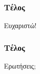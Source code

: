 \documentclass{beamer}
\begin{document}
\begin{frame}
  \frametitle{Τέλος}
  \centering
  Ευχαριστώ!
\end{frame}

\begin{frame}
  \frametitle{Τέλος}
  \centering
  Ερωτήσεις;
\end{frame}
\end{document}
